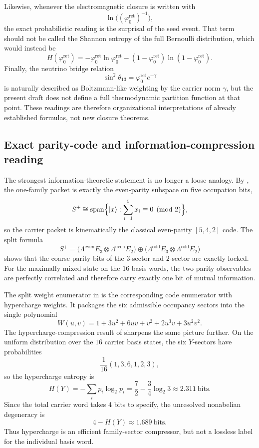 \documentclass[11pt,a4paper]{article}
\theoremstyle{definition}
\theoremstyle{remark}
\newcommand{\phiz}{\varphi_0^{\mathrm{ret}}}
\begin{document}
Likewise, whenever the electromagnetic closure is written with
\[
\ln\!\bigl((\phiz)^{-1}\bigr),
\]
the exact probabilistic reading is the surprisal of the seed event. That term should not be called the Shannon entropy of the full Bernoulli distribution, which would instead be
\[
H(\phiz)
=
-\phiz\ln\phiz-(1-\phiz)\ln(1-\phiz).
\]
Finally, the neutrino bridge relation
\[
\sin^2\theta_{13}=\phiz e^{-\gamma}
\]
is naturally described as Boltzmann-like weighting by the carrier norm $\gamma$, but the present draft does not define a full thermodynamic partition function at that point. These readings are therefore organizational interpretations of already established formulas, not new closure theorems.

\subsection{Exact parity-code and information-compression reading}

The strongest information-theoretic statement is no longer a loose analogy. By , the one-family packet is exactly the even-parity subspace on five occupation bits,
\[
S^+
\cong
\mathrm{span}\Bigl\{|x\rangle:\sum_{i=1}^5 x_i\equiv 0 \pmod 2\Bigr\},
\]
so the carrier packet is kinematically the classical even-parity $[5,4,2]$ code. The split formula
\[
S^+
=
\bigl(\Lambda^{\mathrm{even}}E_3\otimes\Lambda^{\mathrm{even}}E_2\bigr)
\oplus
\bigl(\Lambda^{\mathrm{odd}}E_3\otimes\Lambda^{\mathrm{odd}}E_2\bigr)
\]
shows that the coarse parity bits of the $3$-sector and $2$-sector are exactly locked. For the maximally mixed state on the $16$ basis words, the two parity observables are perfectly correlated and therefore carry exactly one bit of mutual information.

The split weight enumerator in  is the corresponding code enumerator with hypercharge weights. It packages the six admissible occupancy sectors into the single polynomial
\[
W(u,v)
=
1+3u^2+6uv+v^2+2u^3v+3u^2v^2.
\]
The hypercharge-compression result of  sharpens the same picture further. On the uniform distribution over the $16$ carrier basis states, the six $Y$-sectors have probabilities
\[
\frac1{16}(1,3,6,1,2,3),
\]
so the hypercharge entropy is
\[
H(Y)
=
-\sum_i p_i\log_2 p_i
=
\frac72-\frac34\log_2 3
\approx
\num{2.311}\ \text{bits}.
\]
Since the total carrier word takes $4$ bits to specify, the unresolved nonabelian degeneracy is
\[
4-H(Y)\approx \num{1.689}\ \text{bits}.
\]
Thus hypercharge is an efficient family-sector compressor, but not a lossless label for the individual basis word.
\end{document}

